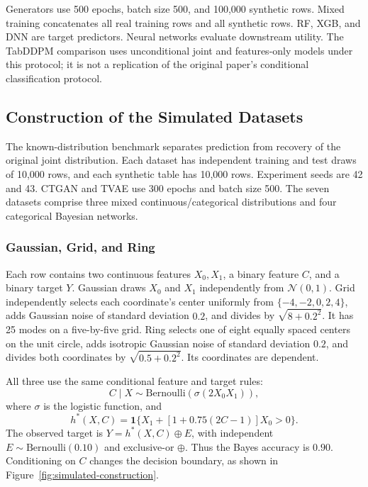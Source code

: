 \documentclass[letterpaper]{article}
\begin{document}
Generators use 500 epochs, batch size 500, and 100,000 synthetic rows.
Mixed training concatenates all real training rows and all synthetic rows.
RF, XGB, and DNN are target predictors. Neural networks
evaluate downstream utility. The TabDDPM comparison uses unconditional
joint and features-only models under this protocol; it is not a replication
of the original paper's conditional classification protocol.

\subsection{Construction of the Simulated Datasets}
The known-distribution benchmark separates prediction from recovery of
the original joint distribution. Each dataset has independent training
and test draws of 10,000 rows, and each synthetic table has 10,000 rows.
Experiment seeds are 42 and 43. CTGAN and TVAE use 300 epochs and batch
size 500. The seven datasets comprise three mixed continuous/categorical
distributions and four categorical Bayesian networks.

\subsubsection{Gaussian, Grid, and Ring}
Each row contains two continuous features $X_0,X_1$, a binary feature $C$,
and a binary target $Y$. Gaussian draws $X_0$ and $X_1$ independently from
$\mathcal N(0,1)$. Grid independently selects each coordinate's center
uniformly from $\{-4,-2,0,2,4\}$, adds Gaussian noise of standard deviation
$0.2$, and divides by $\sqrt{8+0.2^2}$. It has 25 modes on a five-by-five
grid. Ring selects one of eight equally spaced centers on the unit circle,
adds isotropic Gaussian noise of standard deviation $0.2$, and divides
both coordinates by $\sqrt{0.5+0.2^2}$. Its coordinates are dependent.

All three use the same conditional feature and target rules:
\begin{equation}
 C\mid X\sim\mathrm{Bernoulli}\!\left(\sigma(2X_0X_1)\right),
\end{equation}
where $\sigma$ is the logistic function, and
\begin{equation}
 h^*(X,C)=\mathbf 1\{X_1+[1+0.75(2C-1)]X_0>0\}.
\end{equation}
The observed target is $Y=h^*(X,C)\mathbin{\oplus}E$, with independent
$E\sim\mathrm{Bernoulli}(0.10)$ and exclusive-or $\oplus$.
Thus the Bayes accuracy is $0.90$. Conditioning on $C$ changes the
decision boundary, as shown in Figure~\ref{fig:simulated-construction}.
\end{document}
